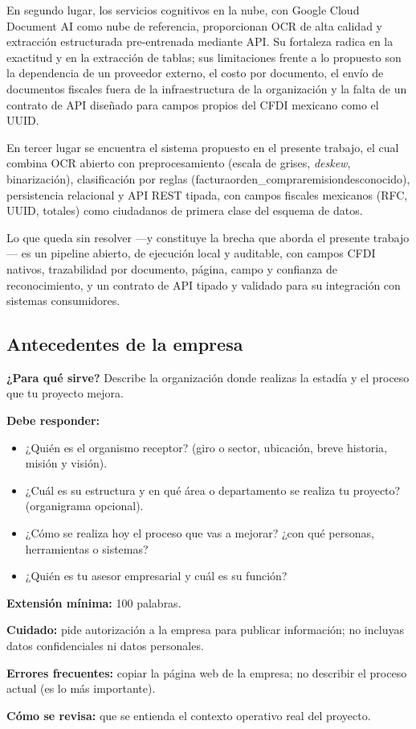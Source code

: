 En segundo lugar, los servicios cognitivos en la nube, con Google Cloud Document AI como nube de referencia, proporcionan OCR de alta calidad y extracción estructurada pre-entrenada mediante API\cite{gcp_document_ai}. Su fortaleza radica en la exactitud y en la extracción de tablas; sus limitaciones frente a lo propuesto son la dependencia de un proveedor externo, el costo por documento, el envío de documentos fiscales fuera de la infraestructura de la organización y la falta de un contrato de API diseñado para campos propios del CFDI mexicano como el UUID.

En tercer lugar se encuentra el sistema propuesto en el presente trabajo, el cual combina OCR abierto con preprocesamiento (escala de grises, \textit{deskew}, binarización), clasificación por reglas (factura\textbar orden\_compra\textbar remision\textbar desconocido), persistencia relacional y API REST tipada, con campos fiscales mexicanos (RFC, UUID, totales) como ciudadanos de primera clase del esquema de datos\cite{sat_cfdi_2024, fastapi_docs}.

Lo que queda sin resolver —y constituye la brecha que aborda el presente trabajo— es un pipeline abierto, de ejecución local y auditable, con campos CFDI nativos, trazabilidad por documento, página, campo y confianza de reconocimiento, y un contrato de API tipado y validado para su integración con sistemas consumidores.


\subsection{Antecedentes de la empresa} \label{sec:antecedentes_empresa} %

\begin{guia}
\textbf{¿Para qué sirve?} Describe la organización donde realizas la estadía y el proceso que tu proyecto mejora.

\textbf{Debe responder:}
\begin{itemize}[nosep,leftmargin=*]
  \item ¿Quién es el organismo receptor? (giro o sector, ubicación, breve historia, misión y visión).
  \item ¿Cuál es su estructura y en qué área o departamento se realiza tu proyecto? (organigrama opcional).
  \item ¿Cómo se realiza hoy el proceso que vas a mejorar? ¿con qué personas, herramientas o sistemas?
  \item ¿Quién es tu asesor empresarial y cuál es su función?
\end{itemize}

\textbf{Extensión mínima:} 100 palabras.

\textbf{Cuidado:} pide autorización a la empresa para publicar información; no incluyas datos confidenciales ni
datos personales.

\textbf{Errores frecuentes:} copiar la página web de la empresa; no describir el proceso actual (es lo más importante).

\textbf{Cómo se revisa:} que se entienda el contexto operativo real del proyecto.
\end{guia}

